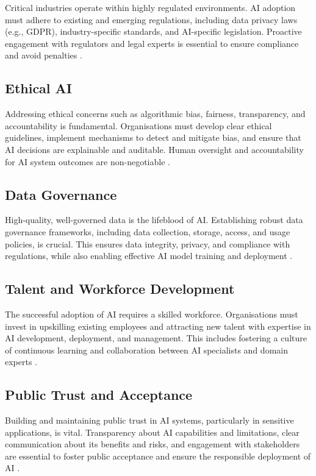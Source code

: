 Critical industries operate within highly regulated environments. AI adoption must adhere to existing and emerging regulations, including data privacy laws (e.g., GDPR), industry-specific standards, and AI-specific legislation. Proactive engagement with regulators and legal experts is essential to ensure compliance and avoid penalties \parencite{dhs2024roles}.

\subsection{Ethical AI}

Addressing ethical concerns such as algorithmic bias, fairness, transparency, and accountability is fundamental. Organisations must develop clear ethical guidelines, implement mechanisms to detect and mitigate bias, and ensure that AI decisions are explainable and auditable. Human oversight and accountability for AI system outcomes are non-negotiable \parencite{leyliabadi2025conceptual}.

\subsection{Data Governance}

High-quality, well-governed data is the lifeblood of AI. Establishing robust data governance frameworks, including data collection, storage, access, and usage policies, is crucial. This ensures data integrity, privacy, and compliance with regulations, while also enabling effective AI model training and deployment \parencite{cisc2025artificial}.

\subsection{Talent and Workforce Development}

The successful adoption of AI requires a skilled workforce. Organisations must invest in upskilling existing employees and attracting new talent with expertise in AI development, deployment, and management. This includes fostering a culture of continuous learning and collaboration between AI specialists and domain experts \parencite{dhs2024roles}.

\subsection{Public Trust and Acceptance}

Building and maintaining public trust in AI systems, particularly in sensitive applications, is vital. Transparency about AI capabilities and limitations, clear communication about its benefits and risks, and engagement with stakeholders are essential to foster public acceptance and ensure the responsible deployment of AI \parencite{leyliabadi2025conceptual}.

